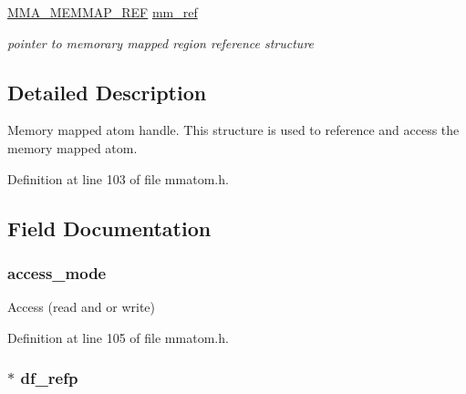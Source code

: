 \begin{DoxyCompactItemize}
\begin{tabbing}
\end{tabbing}\item 
\hyperlink{struct_m_m_a___m_e_m_m_a_p___r_e_f}{M\-M\-A\-\_\-\-M\-E\-M\-M\-A\-P\-\_\-\-R\-E\-F} \hyperlink{struct_m_m_a___h_a_n_d_l_e_aeda9825879900d8dab7aeb2590edec58}{mm\-\_\-ref}
\begin{DoxyCompactList}\small\item\em pointer to memorary mapped region reference structure \end{DoxyCompactList}\end{DoxyCompactItemize}


\subsection{Detailed Description}
Memory mapped atom handle. This structure is used to reference and access the memory mapped atom. 

Definition at line 103 of file mmatom.\-h.



\subsection{Field Documentation}
\hypertarget{struct_m_m_a___h_a_n_d_l_e_a98aa4874a71c2ed9fb7dda0b285507b8}{
\subsubsection[{access\-\_\-mode}]{ access\-\_\-mode}}\label{struct_m_m_a___h_a_n_d_l_e_a98aa4874a71c2ed9fb7dda0b285507b8}


Access (read and or write) 



Definition at line 105 of file mmatom.\-h.

\hypertarget{struct_m_m_a___h_a_n_d_l_e_a32aee81eaefaf0b164da0b9375fc4f2d}{
\subsubsection[{df\-\_\-refp}]{$\ast$ df\-\_\-refp}}\label{struct_m_m_a___h_a_n_d_l_e_a32aee81eaefaf0b164da0b9375fc4f2d}


